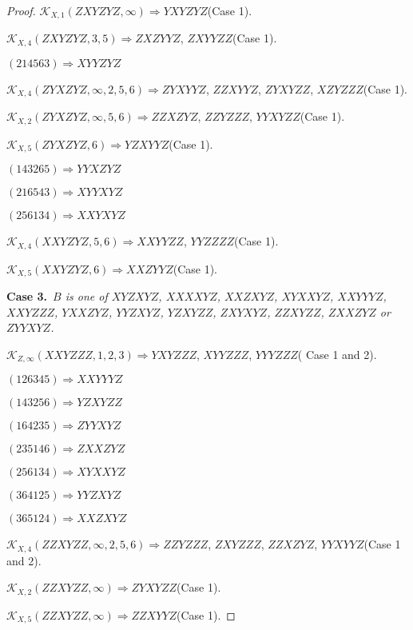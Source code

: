 \documentclass[12pt]{article}
\theoremstyle{plain}
\theoremstyle{definition}
\theoremstyle{remark}
\newcommand{\fancy}[1]{\mathcal{#1}}
\def\K{\fancy{K}}
\newcommand{\case}[2]{{\bf Case #1.}~{\it #2}~~}
\begin{document}
\begin{proof}
	$\K_{X,1}(ZXYZYZ,\infty)\Rightarrow $$YXYZYZ$(Case 1).
	
	$\K_{X,4}(ZXYZYZ,3, 5)\Rightarrow $$ZXZYYZ$, $ZXYYZZ$(Case 1).
	
	
	
	$(2 1 4 5 6 3)\Rightarrow XYYZYZ$
	
	
	
	$\K_{X,4}(ZYXZYZ,\infty,2, 5, 6)\Rightarrow $$ZYXYYZ$, $ZZXYYZ$, $ZYXYZZ$, $XZYZZZ$(Case 1).
	
	$\K_{X,2}(ZYXZYZ,\infty,5, 6)\Rightarrow $$ZZXZYZ$, $ZZYZZZ$, $YYXYZZ$(Case 1).
	
	$\K_{X,5}(ZYXZYZ,6)\Rightarrow $$YZXYYZ$(Case 1).
	
	
	
	$(1 4 3 2 6 5)\Rightarrow YYXZYZ$
	
	$(2 1 6 5 4 3)\Rightarrow XYYXYZ$
	
	$(2 5 6 1 3 4)\Rightarrow XXYXYZ$
	
	
	
	$\K_{X,4}(XXYZYZ,5, 6)\Rightarrow $$XXYYZZ$, $YYZZZZ$(Case 1).
	
	$\K_{X,5}(XXYZYZ,6)\Rightarrow $$XXZYYZ$(Case 1).
	
	
	
	\bigskip
	\case{3}{$B$ is one of $XYZXYZ$, $XXXXYZ$, $XXZXYZ$, $XYXXYZ$, $XXYYYZ$, $XXYZZZ$, $YXXZYZ$, $YYZXYZ$, $YZXYZZ$, $ZXYXYZ$, $ZZXYZZ$, $ZXXZYZ$ or $ZYYXYZ$.}
	
	\bigskip
	
	$\K_{Z,\infty}(XXYZZZ,1, 2, 3)\Rightarrow $$YXYZZZ$, $XYYZZZ$, $YYYZZZ$( Case 1 and 2).
	
	
	
	$(1 2 6 3 4 5)\Rightarrow XXYYYZ$
	
	$(1 4 3 2 5 6)\Rightarrow YZXYZZ$
	
	$(1 6 4 2 3 5)\Rightarrow ZYYXYZ$
	
	$(2 3 5 1 4 6)\Rightarrow ZXXZYZ$
	
	$(2 5 6 1 3 4)\Rightarrow XYXXYZ$
	
	$(3 6 4 1 2 5)\Rightarrow YYZXYZ$
	
	$(3 6 5 1 2 4)\Rightarrow XXZXYZ$
	
	
	
	$\K_{X,4}(ZZXYZZ,\infty,2, 5, 6)\Rightarrow $$ZZYZZZ$, $ZXYZZZ$, $ZZXZYZ$, $YYXYYZ$(Case 1 and 2).
	
	$\K_{X,2}(ZZXYZZ,\infty)\Rightarrow $$ZYXYZZ$(Case 1).
	
	$\K_{X,5}(ZZXYZZ,\infty)\Rightarrow $$ZZXYYZ$(Case 1).
	

\end{proof}
\end{document}
